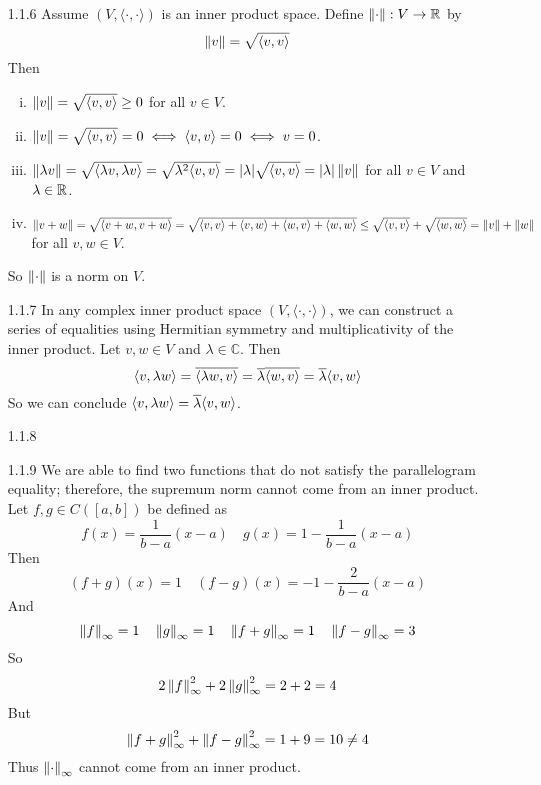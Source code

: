 \documentclass[../../Solutions.tex]{subfiles}
\begin{document}
\begin{itemize}
	\item [1.1.6] Assume $(V,\langle\cdot,\cdot\rangle)$ is an inner product space.
	Define $\left\lVert\cdot\right\rVert:V \to \mathbb{R}$ by
	$$ \left\lVert v\right\rVert = \sqrt{\langle v,v \rangle} $$
	Then
	\begin{enumerate}[(i)]
		\item $\left\lVert v\right\rVert = \sqrt{\langle v,v \rangle} \geq 0$ for all $v \in V$.
		\item $\left\lVert v\right\rVert = \sqrt{\langle v,v \rangle} = 0 \iff \langle v,v \rangle = 0 \iff v = 0$.
		\item $\left\lVert\lambda v\right\rVert = \sqrt{\langle \lambda v,\lambda v \rangle} = \sqrt{\lambda^2\langle v,v \rangle} = |\lambda|\sqrt{\langle v,v \rangle} = |\lambda|\left\lVert v\right\rVert$ for all $v \in V$ and $\lambda \in \mathbb{R}$.
		\item $\left\lVert v+w\right\rVert = \sqrt{\langle v+w,v+w \rangle} = \sqrt{\langle v,v \rangle + \langle v,w \rangle + \langle w,v \rangle + \langle w,w \rangle} \leq \sqrt{\langle v,v \rangle} + \sqrt{\langle w,w \rangle} = \left\lVert v\right\rVert+\left\lVert w\right\rVert$ for all $v,w \in V$.
	\end{enumerate}
	So $\left\lVert\cdot\right\rVert$ is a norm on $V$.
	
	\item [1.1.7] In any complex inner product space $(V,\langle\cdot,\cdot\rangle)$, we can construct a series of equalities using Hermitian symmetry and multiplicativity of the inner product.
	Let $v,w \in V$ and $\lambda \in \mathbb{C}$. Then
	$$ \langle v,\lambda w \rangle = \overline{\langle \lambda w,v \rangle} = \overline{\lambda} \overline{\langle w,v \rangle} = \overline{\lambda}\langle v,w \rangle $$
	So we can conclude $\langle v,\lambda w \rangle = \overline{\lambda}\langle v,w \rangle$.
	
	\item [1.1.8]
	
	\item [1.1.9] We are able to find two functions that do not satisfy the parallelogram equality; therefore, the supremum norm cannot come from an inner product.
	Let $f,g \in C([a,b])$ be defined as
	$$ f(x) = \frac{1}{b-a}(x-a) \quad g(x)=1-\frac{1}{b-a}(x-a) $$
	Then
	$$ (f+g)(x) = 1 \quad (f-g)(x) = -1-\frac{2}{b-a}(x-a) $$
	And
	$$ \left\lVert f\right\rVert_\infty = 1 \quad \left\lVert g\right\rVert_\infty = 1 \quad \left\lVert f+g\right\rVert_\infty = 1 \quad \left\lVert f-g\right\rVert_\infty = 3 $$
	So
	$$ 2\left\lVert f\right\rVert_\infty^2 + 2\left\lVert g\right\rVert_\infty^2 = 2+2 = 4 $$
	But
	$$ \left\lVert f+g\right\rVert_\infty^2+\left\lVert f-g\right\rVert_\infty^2 = 1+9 = 10 \neq 4 $$
	Thus $\left\lVert\cdot\right\rVert_\infty$ cannot come from an inner product.
	

\end{itemize}
\end{document}

